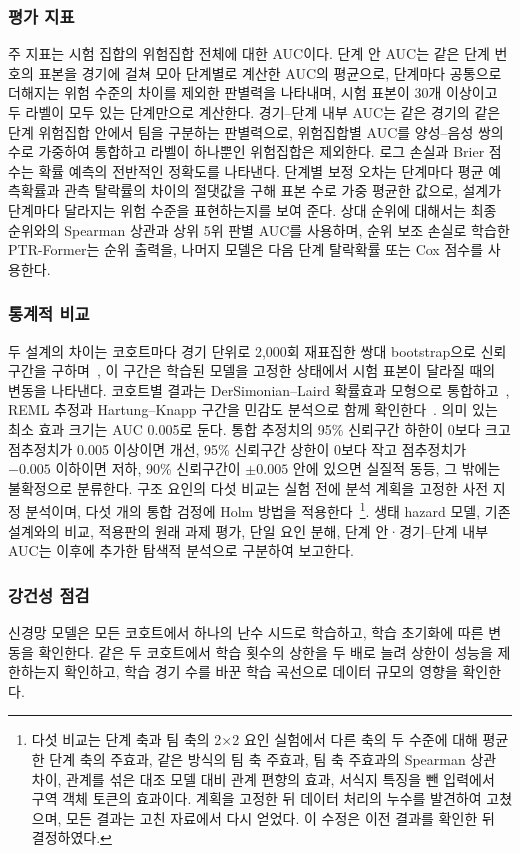 \subsubsection{평가 지표}
주 지표는 시험 집합의 위험집합 전체에 대한 AUC이다.
단계 안 AUC는 같은 단계 번호의 표본을 경기에 걸쳐 모아 단계별로 계산한 AUC의 평균으로, 단계마다 공통으로 더해지는 위험 수준의 차이를 제외한 판별력을 나타내며, 시험 표본이 30개 이상이고 두 라벨이 모두 있는 단계만으로 계산한다.
경기--단계 내부 AUC는 같은 경기의 같은 단계 위험집합 안에서 팀을 구분하는 판별력으로, 위험집합별 AUC를 양성--음성 쌍의 수로 가중하여 통합하고 라벨이 하나뿐인 위험집합은 제외한다.
로그 손실과 Brier 점수는 확률 예측의 전반적인 정확도를 나타낸다.
단계별 보정 오차는 단계마다 평균 예측확률과 관측 탈락률의 차이의 절댓값을 구해 표본 수로 가중 평균한 값으로, 설계가 단계마다 달라지는 위험 수준을 표현하는지를 보여 준다.
상대 순위에 대해서는 최종 순위와의 Spearman 상관과 상위 5위 판별 AUC를 사용하며, 순위 보조 손실로 학습한 PTR-Former는 순위 출력을, 나머지 모델은 다음 단계 탈락확률 또는 Cox 점수를 사용한다.

\subsubsection{통계적 비교}
두 설계의 차이는 코호트마다 경기 단위로 2,000회 재표집한 쌍대 bootstrap으로 신뢰구간을 구하며~\cite{Efron93}, 이 구간은 학습된 모델을 고정한 상태에서 시험 표본이 달라질 때의 변동을 나타낸다.
코호트별 결과는 DerSimonian--Laird 확률효과 모형으로 통합하고~\cite{DerSimonian86}, REML 추정과 Hartung--Knapp 구간을 민감도 분석으로 함께 확인한다~\cite{Viechtbauer05,HartungKnapp01,SidikJonkman02}.
의미 있는 최소 효과 크기는 AUC 0.005로 둔다.
통합 추정치의 95\% 신뢰구간 하한이 0보다 크고 점추정치가 0.005 이상이면 개선, 95\% 신뢰구간 상한이 0보다 작고 점추정치가 $-0.005$ 이하이면 저하, 90\% 신뢰구간이 $\pm0.005$ 안에 있으면 실질적 동등, 그 밖에는 불확정으로 분류한다.
구조 요인의 다섯 비교는 실험 전에 분석 계획을 고정한 사전 지정 분석이며, 다섯 개의 통합 검정에 Holm 방법을 적용한다~\cite{Holm79}\footnote{다섯 비교는 단계 축과 팀 축의 2$\times$2 요인 실험에서 다른 축의 두 수준에 대해 평균한 단계 축의 주효과, 같은 방식의 팀 축 주효과, 팀 축 주효과의 Spearman 상관 차이, 관계를 섞은 대조 모델 대비 관계 편향의 효과, 서식지 특징을 뺀 입력에서 구역 객체 토큰의 효과이다. 계획을 고정한 뒤 데이터 처리의 누수를 발견하여 고쳤으며, 모든 결과는 고친 자료에서 다시 얻었다. 이 수정은 이전 결과를 확인한 뒤 결정하였다.}.
생태 hazard 모델, 기존 설계와의 비교, 적용판의 원래 과제 평가, 단일 요인 분해, 단계 안·경기--단계 내부 AUC는 이후에 추가한 탐색적 분석으로 구분하여 보고한다.

\subsubsection{강건성 점검}
신경망 모델은 모든 코호트에서 하나의 난수 시드로 학습하고,  학습 초기화에 따른 변동을 확인한다.
같은 두 코호트에서 학습 횟수의 상한을 두 배로 늘려 상한이 성능을 제한하는지 확인하고, 학습 경기 수를  바꾼 학습 곡선으로 데이터 규모의 영향을 확인한다.
